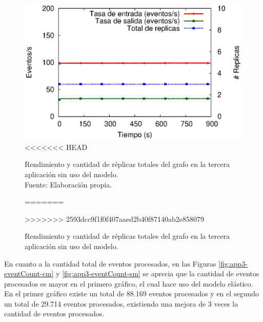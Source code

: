 \begin{figure}[!ht]
	\centering
	\captionsetup{justification=centering}
	\includegraphics[scale=0.7]{images/exp/app3/sm/logical/processSystem.eps}
<<<<<<< HEAD
    \caption[Rendimiento y cantidad de réplicas totales del grafo en la tercera aplicación sin uso del modelo.]{Rendimiento y cantidad de réplicas totales del grafo en la tercera aplicación sin uso del modelo.\\Fuente: Elaboración propia.}
=======
    \caption{Rendimiento y cantidad de r\'eplicas totales del grafo en la tercera aplicaci\'on sin uso del modelo.}
>>>>>>> 2593dcc9f1f0f407aaed2b40f87140ab2e858079
	\label{fig:app3-processSystem-sm}
\end{figure}

En cuanto a la cantidad total de eventos procesados, en las Figuras \ref{fig:app3-eventCount-cm} y \ref{fig:app3-eventCount-sm} se aprecia que la cantidad de eventos procesados es mayor en el primero gr\'afico, el cual hace uso del modelo el\'astico. En el primer gr\'afico existe un total de 88.169 eventos procesados y en el segundo un total de 29.714 eventos procesados, existiendo una mejora de 3 veces la cantidad de eventos procesados.


